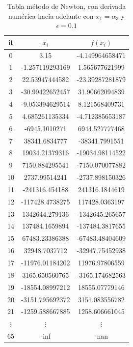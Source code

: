 \documentclass{article} %
\begin{document}
\begin{table}[H]
\centering
\begin{tabular}{|c|c|c|}
\hline
it & $x_i$ & $f(x_i)$\\
\hline
0 & 3.15 & -4.149964658471\\
1 & -1.257119293169 & 1.565677621999\\
2 & 22.53947444582 & -23.39287281879\\
3 & -30.99422652457 & 31.90662094839\\
4 & -9.053394629514 & 8.121568409731\\
5 & 4.685261135334 & -4.712385653187\\
6 & -6945.1010271 & 6944.527777468\\
7 & 38341.6834777 & -38341.7991551\\
8 & 19034.21379316 & -19034.98114522\\
9 & 7150.884295541 & -7150.070077882\\
10 & 2737.99514241 & -2737.898150326\\
11 & -241316.454188 & 241316.1844619\\
12 & -117428.4738275 & 117428.0363197\\
13 & 1342644.279136 & -1342645.265657\\
14 & 137484.1659894 & -137484.3817655\\
15 & 67483.23386388 & -67483.48404609\\
16 & 32948.7037712 & -32947.75452938\\
17 & -11976.01184202 & 11976.97806559\\
18 & 3165.650560765 & -3165.174682563\\
19 & -18554.08997212 & 18555.07779146\\
20 & -3151.795692372 & 3151.083556782\\
21 & -1259.588667885 & 1258.606661045\\
$\vdots$ & $\vdots$ & $\vdots$\\
65 & -inf & -nan\\
\hline
\end{tabular}
\caption{Tabla método de Newton, con derivada numérica hacia adelante con $x_1 = \alpha_3$ y $\epsilon = 0.1$}
\end{table}
\end{document}
